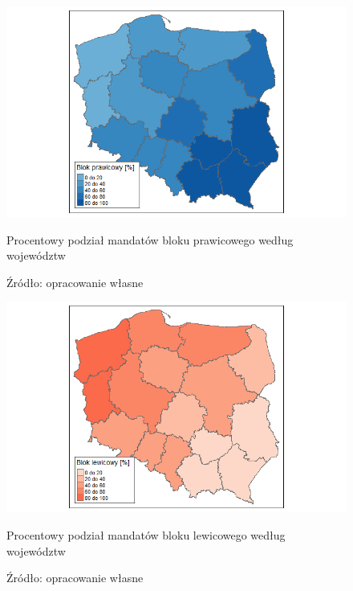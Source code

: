 \begin{figure}[H]
    \centering
    \includegraphics[width=1\textwidth]{rozdzial3/blok_prawicowy_proc.jpg}
    \caption{Procentowy podział mandatów bloku prawicowego według województw}
    \caption*{Źródło: opracowanie własne}
    \label{fig:my_label}

    \centering
    \includegraphics[width=1\textwidth]{rozdzial3/blok_lewicowy_proc.jpg}
    \caption{Procentowy podział mandatów bloku lewicowego według województw}
    \caption*{Źródło: opracowanie własne}
    \label{fig:my_label}
\end{figure}


